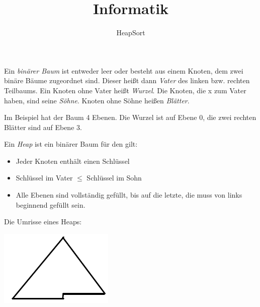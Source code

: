 \documentclass{beamer}
\begin{document}
\title{Informatik}   
\author{HeapSort} 
\date{}
\frame{\titlepage} 


\begin{frame}[fragile]


Ein \textit{binärer Baum} ist entweder leer oder besteht aus einem Knoten, dem zwei binäre Bäume zugeordnet sind. \pause Dieser heißt dann \textit{Vater} des linken bzw. rechten Teilbaums. \pause Ein Knoten ohne Vater heißt \textit{Wurzel}. \pause Die Knoten, die x zum Vater haben, sind seine \textit{Söhne}. Knoten ohne Söhne heißen
 \textit{Blätter}. \pause

Im Beispiel hat der Baum 4 Ebenen. Die Wurzel ist auf Ebene 0, die zwei rechten Blätter sind auf Ebene 3.
\end{frame}

\begin{frame}[fragile]
Ein \textit{Heap} ist ein binärer Baum für den gilt:  
\begin{itemize}
\item Jeder Knoten enthält einen Schlüssel \\ \pause
\item Schlüssel im Vater $\le$ Schlüssel im Sohn \\ \pause 
\item Alle Ebenen sind vollständig gefüllt, bis auf die letzte, die muss von links beginnend gefüllt sein. \pause
\end{itemize}

Die Umrisse eines Heaps: 

\includegraphics[scale=0.6]{heap.png}
\end{frame}
\end{document}
